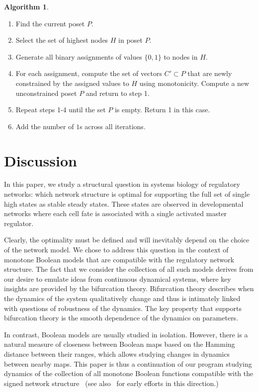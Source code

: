 \documentclass[12pt]{amsart}
\theoremstyle{definition}
\newtheorem{algorithm}[thm]{Algorithm}
\begin{document}
\begin{algorithm}
    \begin{enumerate}
        \item Find the current poset $P$.
        \item Select the set of highest nodes $H$ in poset $P$.
        \item Generate all binary assignments of values $\{0,1\}$ to nodes in $H$.
        \item For each assignment, compute the set of vectors $C' \subset P$ that are newly constrained by the assigned values to $H$ using monotonicity. Compute a new unconstrained poset $P$ and return to step 1. 
        \item Repeat steps 1-4 until the set $P$ is empty. Return 1 in this case.
        \item Add the number of $1$s across all iterations.
    \end{enumerate}
    \label{alg:MScount}
\end{algorithm}

\section{Discussion}
In this paper, we study a structural question in systems biology of regulatory networks: which network structure is optimal for supporting the full set of single high states as stable steady states. These states are observed in developmental networks where each cell fate is associated with a single activated master regulator. 

Clearly, the optimality must be defined and will inevitably depend on the choice of the network model. We chose to address this question in the context of monotone Boolean models that are compatible with the regulatory network structure. The fact that we consider the collection of all such models derives from our desire to emulate
ideas from continuous dynamical systems, where key insights are provided by the bifurcation theory. %
Bifurcation theory describes when the dynamics of the system qualitatively change and thus is intimately linked with questions of robustness of the dynamics. The key property that supports bifurcation theory is the smooth dependence of the dynamics on parameters. 

In contrast, Boolean models are usually studied in isolation.
However, there is a natural measure of closeness between Boolean maps based on the Hamming distance between their ranges, which allows studying changes in dynamics between nearby maps. This paper is thus a continuation of our program studying dynamics of the collection of all monotone Boolean functions compatible with the signed network structure~\cite{adigwe_characterization_2026,gedeon_lattice_2024, gedeon_network_2024} (see also~\cite{abou-jaoude_logical_2019} for early efforts in this direction.)
\end{document}
